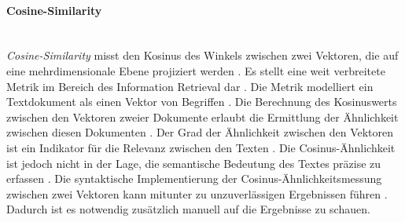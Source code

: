 \paragraph{Cosine-Similarity}\mbox{}\\
\emph{Cosine-Similarity} misst den Kosinus des Winkels zwischen zwei Vektoren, die auf eine mehrdimensionale Ebene projiziert werden \cite{sitikhu2019comparison}. Es stellt eine weit verbreitete Metrik im Bereich des Information Retrieval dar \cite{rahutomo2012semantic}. Die Metrik modelliert ein Textdokument als einen Vektor von Begriffen \cite{rahutomo2012semantic}. Die Berechnung des Kosinuswerts zwischen den Vektoren zweier Dokumente erlaubt die Ermittlung der Ähnlichkeit zwischen diesen Dokumenten \cite{rahutomo2012semantic}. Der Grad der Ähnlichkeit zwischen den Vektoren ist ein Indikator für die Relevanz zwischen den Texten \cite{rahutomo2012semantic}. Die Cosinus-Ähnlichkeit ist jedoch nicht in der Lage, die semantische Bedeutung des Textes präzise zu erfassen \cite{rahutomo2012semantic}. Die syntaktische Implementierung der Cosinus-Ähnlichkeitsmessung zwischen zwei Vektoren kann mitunter zu unzuverlässigen Ergebnissen führen \cite{rahutomo2012semantic}. Dadurch ist es notwendig zusätzlich manuell auf die Ergebnisse zu schauen.
